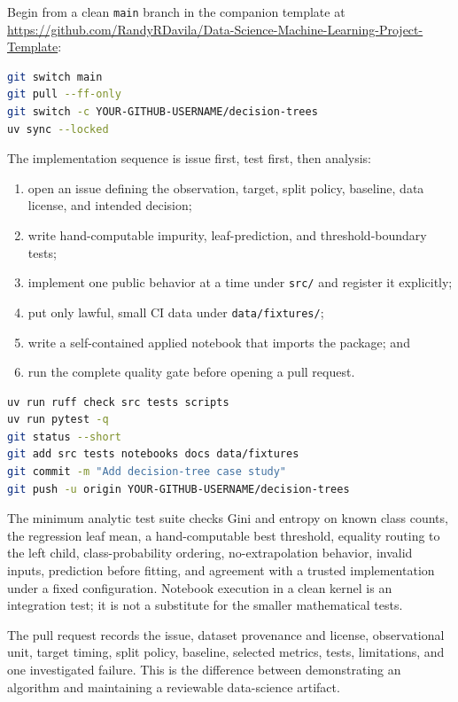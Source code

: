 Begin from a clean \texttt{main} branch in the companion template at
\url{https://github.com/RandyRDavila/Data-Science-Machine-Learning-Project-Template}:
\begin{lstlisting}[language=bash,numbers=none]
git switch main
git pull --ff-only
git switch -c YOUR-GITHUB-USERNAME/decision-trees
uv sync --locked
\end{lstlisting}

The implementation sequence is issue first, test first, then analysis:
\begin{enumerate}
  \item open an issue defining the observation, target, split policy, baseline,
  data license, and intended decision;
  \item write hand-computable impurity, leaf-prediction, and threshold-boundary
  tests;
  \item implement one public behavior at a time under \texttt{src/} and register
  it explicitly;
  \item put only lawful, small CI data under \texttt{data/fixtures/};
  \item write a self-contained applied notebook that imports the package; and
  \item run the complete quality gate before opening a pull request.
\end{enumerate}

\begin{lstlisting}[language=bash,numbers=none]
uv run ruff check src tests scripts
uv run pytest -q
git status --short
git add src tests notebooks docs data/fixtures
git commit -m "Add decision-tree case study"
git push -u origin YOUR-GITHUB-USERNAME/decision-trees
\end{lstlisting}

The minimum analytic test suite checks Gini and entropy on known class counts,
the regression leaf mean, a hand-computable best threshold, equality routing to
the left child, class-probability ordering, no-extrapolation behavior, invalid
inputs, prediction before fitting, and agreement with a trusted implementation
under a fixed configuration. Notebook execution in a clean kernel is an
integration test; it is not a substitute for the smaller mathematical tests.

The pull request records the issue, dataset provenance and license,
observational unit, target timing, split policy, baseline, selected metrics,
tests, limitations, and one investigated failure. This is the difference
between demonstrating an algorithm and maintaining a reviewable data-science
artifact.

